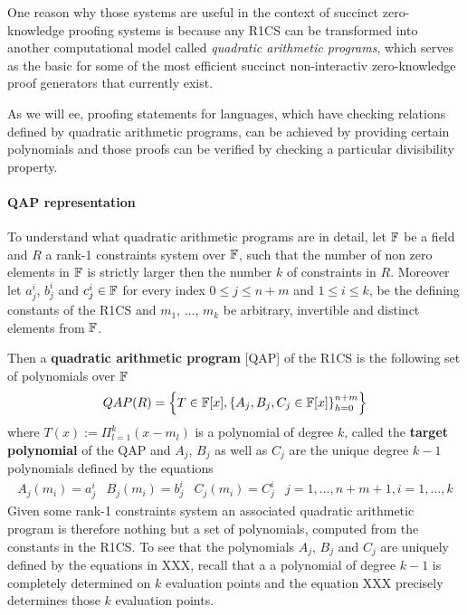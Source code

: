 One reason why those systems are useful in the context of succinct zero-knowledge proofing systems is because any R1CS can be transformed into another computational model called \textit{quadratic arithmetic programs}, which serves as the basic for some of the most efficient succinct non-interactiv zero-knowledge proof generators that currently exist. 

As we will ee, proofing statements for languages, which have checking relations defined by quadratic arithmetic programs, can be achieved by providing certain polynomials and those proofs can be verified by checking a particular divisibility property. 
\paragraph{QAP representation} To understand what quadratic arithmetic programs are in detail, let $\mathbb{F}$ be a field and $R$ a rank-1 constraints system over $\mathbb{F}$, such that the number of non zero elements in $\mathbb{F}$ is strictly larger then the number $k$ of constraints in $R$. Moreover let $a_j^i$, $b_j^i$ and $c_j^i\in\mathbb{F}$ for every index $0\leq j \leq n+m$ and $1\leq i \leq k$, be the defining constants of the R1CS and $m_1$, $\ldots$, $m_k$ be arbitrary, invertible and distinct elements from $\mathbb{F}$.
  
Then a \textbf{quadratic arithmetic program} [QAP] of the R1CS is the following set of polynomials over $\mathbb{F}$
\begin{equation}
QAP(R) = \left\{T\in \mathbb{F}[x],\left\{A_j,B_j,C_j\in \mathbb{F}[x]\right\}_{h=0}^{n+m}\right\}
\end{equation}
where $T(x) := \Pi_{l=1}^k (x- m_l)$ is a polynomial of degree $k$, called the \textbf{target polynomial} of the QAP and $A_j$, $B_j$ as well as $C_j$ are the unique degree $k-1$ polynomials defined by the equations
\begin{equation}
\begin{array}{lllr}
A_j(m_i)=a_j^i & B_j(m_i)=b_j^i & C_j(m_i)=C_j^i & j= 1, \ldots , n+m+1, i=1,\ldots,k 
\end{array}
\end{equation}
Given some rank-1 constraints system an associated quadratic arithmetic program is therefore nothing but a set of polynomials, computed from the constants in the R1CS. To see that the polynomials $A_j$, $B_j$ and $C_j$ are uniquely defined by the equations in XXX, recall that a a polynomial of degree $k-1$ is completely determined on $k$ evaluation points and the equation XXX precisely determines those $k$ evaluation points.

